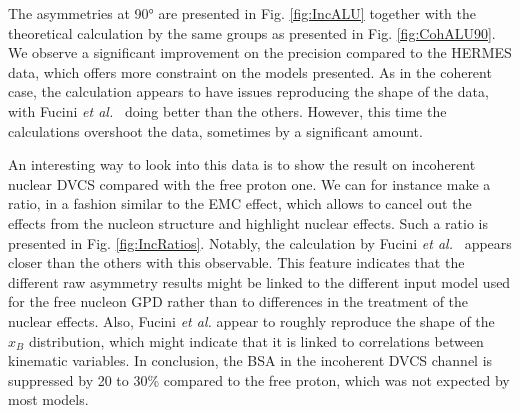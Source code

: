 \documentclass[aps,prc,preprint,superscriptaddress]{revtex4}
\begin{document}
The asymmetries at 90° are presented in Fig. \ref{fig:IncALU} together with the theoretical
calculation by the same groups as presented in Fig. \ref{fig:CohALU90}. We observe a 
significant improvement on the precision compared to 
the HERMES data, which offers more constraint on the models presented. As in the
coherent case, the calculation appears to have issues reproducing the shape of the data,
with Fucini {\it et al.}~\cite{Fucini:2019xlc} doing better than the others.
However, this time the calculations overshoot the data, sometimes by a significant amount.

An interesting way to look into this data is to show the result on incoherent nuclear DVCS compared 
with the free proton one. We can for instance make a ratio, in a fashion similar to the EMC 
effect, which allows to cancel out
the effects from the nucleon structure and highlight nuclear effects. Such a ratio is presented
in Fig. \ref{fig:IncRatios}.
Notably, the calculation by Fucini {\it et al.}~\cite{Fucini:2019xlc} appears closer than the
others with this observable. This feature indicates that the different raw asymmetry results might be 
linked to the different input model used for the free nucleon GPD rather than to differences in the 
treatment of the nuclear effects. Also, Fucini {\it et al.} appear to roughly reproduce the 
shape of the $x_B$ distribution, which might indicate that it is linked to correlations between kinematic variables.
In conclusion, the BSA in the incoherent DVCS channel is suppressed by 20 to 30\% compared to the free proton,
which was not expected by most models.
\end{document}
